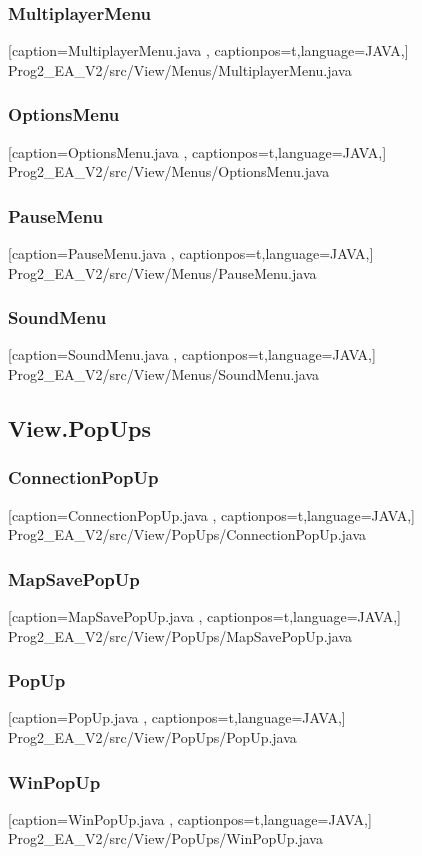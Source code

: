 \documentclass[a4paper,12pt]{scrartcl}
\begin{document}
	\subsubsection{MultiplayerMenu}
	
	[caption={MultiplayerMenu.java}
	\label{lst:javaclass},
	captionpos=t,language=JAVA,]
	{Prog2_EA_V2/src/View/Menus/MultiplayerMenu.java}
	\subsubsection{OptionsMenu}
	
	[caption={OptionsMenu.java}
	\label{lst:javaclass},
	captionpos=t,language=JAVA,]
	{Prog2_EA_V2/src/View/Menus/OptionsMenu.java}
	\subsubsection{PauseMenu}
	
	[caption={PauseMenu.java}
	\label{lst:javaclass},
	captionpos=t,language=JAVA,]
	{Prog2_EA_V2/src/View/Menus/PauseMenu.java}
	\subsubsection{SoundMenu}
	
	[caption={SoundMenu.java}
	\label{lst:javaclass},
	captionpos=t,language=JAVA,]
	{Prog2_EA_V2/src/View/Menus/SoundMenu.java}
	\subsection{View.PopUps}
	\subsubsection{ConnectionPopUp}
	
	[caption={ConnectionPopUp.java}
	\label{lst:javaclass},
	captionpos=t,language=JAVA,]
	{Prog2_EA_V2/src/View/PopUps/ConnectionPopUp.java}
	\subsubsection{MapSavePopUp}
	
	[caption={MapSavePopUp.java}
	\label{lst:javaclass},
	captionpos=t,language=JAVA,]
	{Prog2_EA_V2/src/View/PopUps/MapSavePopUp.java}
	\subsubsection{PopUp}
	
	[caption={PopUp.java}
	\label{lst:javaclass},
	captionpos=t,language=JAVA,]
	{Prog2_EA_V2/src/View/PopUps/PopUp.java}
	\subsubsection{WinPopUp}
	
	[caption={WinPopUp.java}
	\label{lst:javaclass},
	captionpos=t,language=JAVA,]
	{Prog2_EA_V2/src/View/PopUps/WinPopUp.java}
\end{document}
